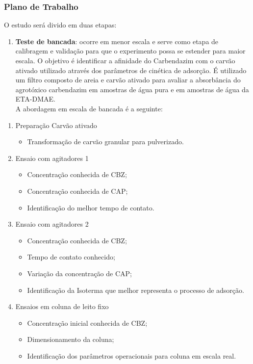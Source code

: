 \documentclass[
]{article}
\providecommand{\tightlist}{%
  \setlength{\itemsep}{0pt}\setlength{\parskip}{0pt}}
\begin{document}
\hypertarget{plano-de-trabalho}{%
\subsubsection{Plano de Trabalho}\label{plano-de-trabalho}}

O estudo será divido em duas etapas:

\begin{enumerate}
\def\labelenumi{\alph{enumi})}
\tightlist
\item
  \textbf{Teste de bancada}: ocorre em menor escala e serve como etapa
  de calibragem e validação para que o experimento possa se estender
  para maior escala. O objetivo é identificar a afinidade do Carbendazim
  com o carvão ativado utilizado através dos parâmetros de cinética de
  adsorção. É utilizado um filtro composto de areia e carvão ativado
  para avaliar a absorbância do agrotóxico carbendazim em amostras de
  água pura e em amostras de água da ETA-DMAE.\\
  A abordagem em escala de bancada é a seguinte:
\end{enumerate}

\begin{enumerate}
\def\labelenumi{\arabic{enumi}.}
\tightlist
\item
  Preparação Carvão ativado

  \begin{itemize}
  \tightlist
  \item
    Transformação de carvão granular para pulverizado.
  \end{itemize}
\item
  Ensaio com agitadores 1

  \begin{itemize}
  \tightlist
  \item
    Concentração conhecida de CBZ;
  \item
    Concentração conhecida de CAP;
  \item
    Identificação do melhor tempo de contato.
  \end{itemize}
\item
  Ensaio com agitadores 2

  \begin{itemize}
  \tightlist
  \item
    Concentração conhecida de CBZ;
  \item
    Tempo de contato conhecido;
  \item
    Variação da concentração de CAP;
  \item
    Identificação da Isoterma que melhor representa o processo de
    adsorção.
  \end{itemize}
\item
  Ensaios em coluna de leito fixo

  \begin{itemize}
  \tightlist
  \item
    Concentração inicial conhecida de CBZ;
  \item
    Dimensionamento da coluna;
  \item
    Identificação dos parâmetros operacionais para coluna em escala
    real.
  \end{itemize}
\end{enumerate}
\end{document}
